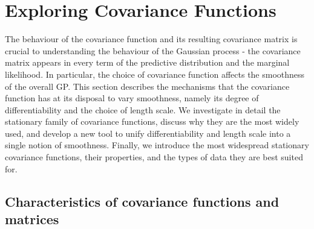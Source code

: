 \section{Exploring Covariance Functions}
The behaviour of the covariance function and its resulting covariance matrix is crucial to understanding the behaviour of the Gaussian process - the covariance matrix appears in every term of the predictive distribution and the marginal likelihood. In particular, the choice of covariance function affects the smoothness of the overall GP. This section describes the mechanisms that the covariance function has at its disposal to vary smoothness, namely its degree of differentiability and the choice of length scale. We investigate in detail the stationary family of covariance functions, discuss why they are the most widely used, and develop a new tool to unify differentiability and length scale into a single notion of smoothness. Finally, we introduce the most widespread stationary covariance functions, their properties, and the types of data they are best suited for.



\subsection{Characteristics of covariance functions and matrices}


